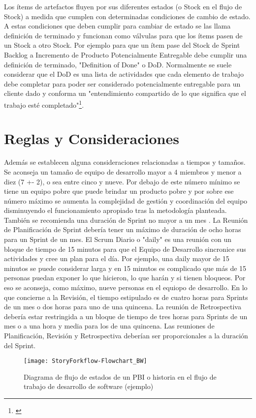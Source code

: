 Los ítems de artefactos fluyen por sus diferentes estados (o Stock en el flujo de Stock) a medida que cumplen con determinadas condiciones de cambio de estado. A estas condiciones que deben cumplir para cambiar de estado se las llama definición de terminado y funcionan como válvulas para que los ítems pasen de un Stock a otro Stock. Por ejemplo para que un ítem pase del Stock de Sprint Backlog a Incremento de Producto Potencialmente Entregable debe cumplir una definición de terminado, "Definition of Done" o DoD. Normalmente se suele considerar que el DoD es una lista de actividades que cada elemento de trabajo debe completar para poder ser considerado potencialmente entregable para un cliente dado y conforma un "entendimiento compartido de lo que significa que el trabajo esté completado"\footnote{\cite{Ken-Jeff-2013}}.

\section{Reglas y Consideraciones}

Además se establecen alguna consideraciones relacionadas a tiempos y tamaños. Se aconseja un tamaño de equipo de desarrollo mayor a 4 miembros y menor a diez (7 +- 2), o sea entre cinco y nueve. Por debajo de este número mínimo se tiene un equipo pobre que puede brindar un producto pobre y por sobre ese número máximo se aumenta la complejidad de gestión y coordinación del equipo disminuyendo el funcionamiento apropiado tras la metodología planteada. También se recomienda una duración de Sprint no mayor a un mes \cite{Ken-Jeff-2013}. La Reunión de Planificación de Sprint debería tener un máximo de duración de ocho horas para un Sprint de un mes. El Scrum Diario o "daily" es una reunión con un bloque de tiempo de 15 minutos para que el Equipo de Desarrollo sincronice sus actividades y cree un plan para el día. Por ejemplo, una daily mayor de 15 minutos se puede considerar larga y en 15 minutos es complicado que más de 15 personas puedan exponer lo que hicieron, lo que harán y si tienen bloqueos. Por eso se aconseja, como máximo, nueve personas en el equiopo de desarrollo. En lo que concierne a la Revisión, el tiempo estipulado es de cuatro horas para Sprints de un mes o dos horas para uno de una quincena. La reunión de Retrospectiva  debería estar restringida a un bloque de tiempo de tres horas para Sprints de un mes o  a una hora y media para los de una quincena. Las reuniones de Planificación, Revisión y Retrospectiva deberían ser proporcionales a la duración del Sprint.

\begin{figure}[h]
  \centering
  \texttt{[image: StoryForkflow-Flowchart\_BW]}
  \caption{Diagrama de flujo de estados de un PBI o historia en el flujo de trabajo de desarrollo de software (ejemplo)}
  \centering
  \label{fig:ScrumArtifactsStockFlow} %
\end{figure}
